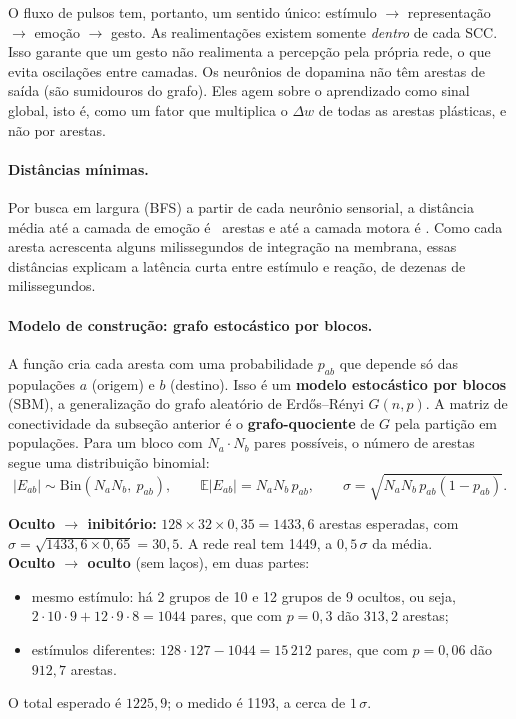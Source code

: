 \documentclass[11pt,a4paper]{article}
\DeclareRobustCommand{\cod}[1]{\texttt{\detokenize{#1}}}
\begin{document}
O fluxo de pulsos tem, portanto, um sentido único: estímulo $\to$ representação $\to$ emoção $\to$ gesto. As realimentações
existem somente \emph{dentro} de cada SCC. Isso garante que um gesto não realimenta a percepção pela própria rede, o que evita
oscilações entre camadas. Os neurônios de dopamina não têm arestas de saída (são sumidouros do grafo). Eles agem sobre o
aprendizado como sinal global, isto é, como um fator que multiplica o $\Delta w$ de todas as arestas plásticas, e não por
arestas.

\paragraph{Distâncias mínimas.} Por busca em largura (BFS) a partir de cada neurônio sensorial, a distância média até a camada de
emoção é \gDistEmo\ arestas e até a camada motora é \gDistMot. Como cada aresta acrescenta alguns milissegundos de integração na
membrana, essas distâncias explicam a latência curta entre estímulo e reação, de dezenas de milissegundos.

\paragraph{Modelo de construção: grafo estocástico por blocos.} A função \cod{montar()} cria cada aresta com uma probabilidade
$p_{ab}$ que depende só das populações $a$ (origem) e $b$ (destino). Isso é um \textbf{modelo estocástico por blocos} (SBM), a
generalização do grafo aleatório de Erdős–Rényi $G(n,p)$. A matriz de conectividade da subseção anterior é o
\textbf{grafo-quociente} de $G$ pela partição em populações. Para um bloco com $N_a\cdot N_b$ pares possíveis, o número de arestas
segue uma distribuição binomial:
\begin{equation}
|E_{ab}|\sim \mathrm{Bin}(N_aN_b,\ p_{ab}),\qquad \mathbb{E}|E_{ab}|=N_aN_b\,p_{ab},\qquad \sigma=\sqrt{N_aN_b\,p_{ab}(1-p_{ab})}.
\end{equation}

\begin{exemplo}
\textbf{Oculto $\to$ inibitório:} $128\times32\times0{,}35 = 1433{,}6$ arestas esperadas, com
$\sigma=\sqrt{1433{,}6\times0{,}65}=30{,}5$. A rede real tem 1449, a $0{,}5\,\sigma$ da média.\\
\textbf{Oculto $\to$ oculto} (sem laços), em duas partes:
\begin{itemize}
  \item mesmo estímulo: há 2 grupos de 10 e 12 grupos de 9 ocultos, ou seja,
        $2\cdot10\cdot9+12\cdot9\cdot8=1044$ pares, que com $p=0{,}3$ dão $313{,}2$ arestas;
  \item estímulos diferentes: $128\cdot127-1044=15\,212$ pares, que com $p=0{,}06$ dão $912{,}7$ arestas.
\end{itemize}
O total esperado é $1225{,}9$; o medido é 1193, a cerca de $1\,\sigma$.
\end{exemplo}
\end{document}
